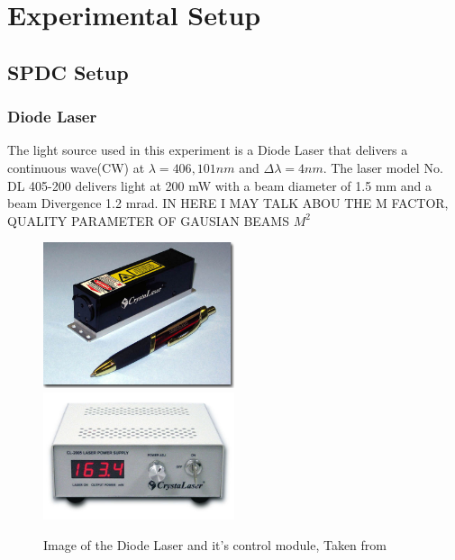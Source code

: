 
\chapter{Experimental Setup} %

\label{Chapter3} %

\section{SPDC Setup}
\subsection{Diode Laser}
The light source used in this experiment is a Diode Laser that delivers a continuous wave(CW) at 
$\lambda = 406,101 nm$ and $\Delta \lambda = 4 nm$. The laser model No. DL 405-200 delivers light at 200 mW with a beam diameter of 1.5 mm and a beam Divergence 1.2 mrad. IN HERE I MAY TALK ABOU THE M FACTOR, QUALITY PARAMETER OF GAUSIAN BEAMS $M^2$ 

\begin{figure}[h!]
\centering
{  \includegraphics[width=0.5\textwidth]{Figures/diodeLaser.jpg} }
{  \includegraphics[width=0.5\textwidth]{Figures/diodeLaserControl.jpg} }
\caption{Image of the Diode Laser and it's control module, Taken from \cite{crystalLaser}}
 \label{fig:diodeLaser}
\end{figure}

